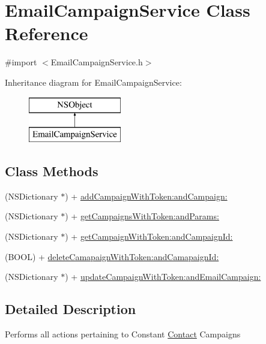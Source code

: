 \hypertarget{interface_email_campaign_service}{\section{Email\-Campaign\-Service Class Reference}
\label{interface_email_campaign_service}
}


{\ttfamily \#import $<$Email\-Campaign\-Service.\-h$>$}

Inheritance diagram for Email\-Campaign\-Service\-:\begin{figure}[H]
\begin{center}
\leavevmode
\includegraphics[height=2.000000cm]{interface_email_campaign_service}
\end{center}
\end{figure}
\subsection*{Class Methods}
\begin{DoxyCompactItemize}
\item 
(N\-S\-Dictionary $\ast$) + \hyperlink{interface_email_campaign_service_aff3df6ccc79c62db7fe50252175a695a}{add\-Campaign\-With\-Token\-:and\-Campaign\-:}
\item 
(N\-S\-Dictionary $\ast$) + \hyperlink{interface_email_campaign_service_ace17a562311bc98376407157dff69bc9}{get\-Campaigns\-With\-Token\-:and\-Params\-:}
\item 
(N\-S\-Dictionary $\ast$) + \hyperlink{interface_email_campaign_service_ac4def12ea65dc06c800b201c0a72166f}{get\-Campaign\-With\-Token\-:and\-Campaign\-Id\-:}
\item 
(B\-O\-O\-L) + \hyperlink{interface_email_campaign_service_adc1f5eae5a704d35f01bbf4d7166083a}{delete\-Camapaign\-With\-Token\-:and\-Camapaign\-Id\-:}
\item 
(N\-S\-Dictionary $\ast$) + \hyperlink{interface_email_campaign_service_ac9e9a4f90263f1e59df9846cb372b0bc}{update\-Campaign\-With\-Token\-:and\-Email\-Campaign\-:}
\end{DoxyCompactItemize}


\subsection{Detailed Description}
Performs all actions pertaining to Constant \hyperlink{interface_contact}{Contact} Campaigns 

